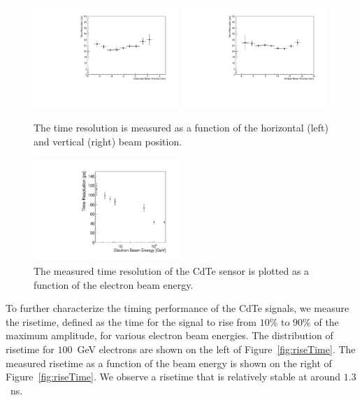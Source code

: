 \begin{figure}[htbp] 
\centering
\includegraphics[width=0.49\textwidth]{figures/TimeResolutionVsBeamHorizontalPosition.pdf} 
\includegraphics[width=0.49\textwidth]{figures/TimeResolutionVsBeamVerticalPosition.pdf} 
\caption{ The time resolution is measured as a function of the horizontal (left) and vertical (right)
beam position. }
\label{fig:TimeResolutionVsBeamXY} 
\end{figure} 




\begin{figure}[htbp] 
\centering
\includegraphics[width=0.49\textwidth]{figures/TimeResolutionVsEnergy.pdf} 
\caption{ The measured time resolution of the CdTe sensor is plotted as a function
of the electron beam energy. } 
\label{fig:ChargeVsEnergy} 
\end{figure} 



To further characterize the timing performance of the CdTe signals, we measure the
risetime, defined as the time for the signal to rise from $10\%$ to $90\%$ of the maximum
amplitude, for various electron beam energies. The distribution of risetime for
$100$~GeV electrons are shown on the left of Figure~\ref{fig:riseTime}. The 
measured risetime as a function of the beam energy is shown on the right of 
Figure~\ref{fig:riseTime}. We observe a risetime that is relatively stable
at around $1.3$~ns.


